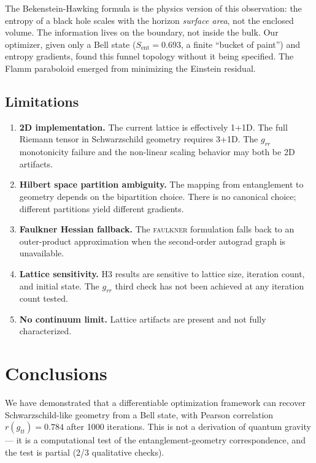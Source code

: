 \documentclass[12pt,a4paper]{article}
\newcommand{\Sent}{S_{\mathrm{ent}}}
\begin{document}
The Bekenstein-Hawking formula is the physics version of this observation:
the entropy of a black hole scales with the horizon \emph{surface area},
not the enclosed volume. The information lives on the boundary, not
inside the bulk. Our optimizer, given only a Bell state ($\Sent=0.693$,
a finite ``bucket of paint'') and entropy gradients, found this funnel
topology without it being specified. The Flamm paraboloid emerged from
minimizing the Einstein residual.

\subsection{Limitations}

\begin{enumerate}
  \item \textbf{2D implementation.} The current lattice is effectively
        1+1D. The full Riemann tensor in Schwarzschild geometry requires
        3+1D. The $g_{rr}$ monotonicity failure and the non-linear
        scaling behavior may both be 2D artifacts.

  \item \textbf{Hilbert space partition ambiguity.} The mapping from
        entanglement to geometry depends on the bipartition choice.
        There is no canonical choice; different partitions yield
        different gradients.

  \item \textbf{Faulkner Hessian fallback.} The \textsc{faulkner}
        formulation falls back to an outer-product approximation when
        the second-order autograd graph is unavailable.

  \item \textbf{Lattice sensitivity.} H3 results are sensitive to
        lattice size, iteration count, and initial state.
        The $g_{rr}$ third check has not been achieved at any
        iteration count tested.

  \item \textbf{No continuum limit.} Lattice artifacts are present
        and not fully characterized.
\end{enumerate}

\section{Conclusions}

We have demonstrated that a differentiable optimization framework can recover
Schwarzschild-like geometry from a Bell state, with Pearson correlation
$r(g_{tt})=0.784$ after 1000 iterations. This is not a derivation of quantum
gravity --- it is a computational test of the entanglement-geometry
correspondence, and the test is partial (2/3 qualitative checks).
\end{document}
